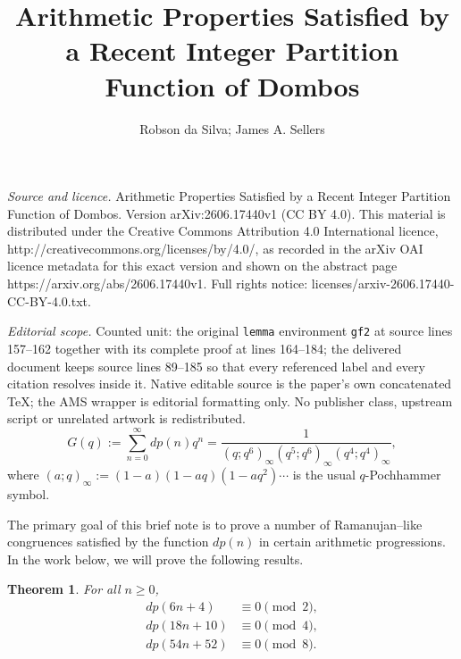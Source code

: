 \documentclass[10pt,a4paper]{amsart}
\newtheorem{theorem}{Theorem}[section]
\begin{document}
\title[Arithmetic Properties Satisfied by a Recent Integer Partitio]{Arithmetic Properties Satisfied by a Recent Integer Partition Function of Dombos}
\author{Robson da Silva; James A. Sellers}
\date{}
\maketitle
\noindent\emph{Source and licence.} Arithmetic Properties Satisfied by a Recent Integer Partition Function of Dombos. Version arXiv:2606.17440v1 (CC BY 4.0). This material is distributed under the Creative Commons Attribution 4.0 International licence, http://creativecommons.org/licenses/by/4.0/, as recorded in the arXiv OAI licence metadata for this exact version and shown on the abstract page https://arxiv.org/abs/2606.17440v1. Full rights notice: licenses/arxiv-2606.17440-CC-BY-4.0.txt.\par\smallskip
\noindent\textit{Editorial scope.} Counted unit: the original \texttt{lemma} environment \texttt{gf2} at source lines 157--162 together with its complete proof at lines 164--184; the delivered document keeps source lines 89--185 so that every referenced label and every citation resolves inside it. Native editable source is the paper's own concatenated TeX; the AMS wrapper is editorial formatting only. No publisher class, upstream script or unrelated artwork is redistributed.
\begin{equation}
G(q):=\sum_{n=0}^{\infty} dp(n)q^n = \frac{1}{(q;q^6)_\infty (q^5;q^6)_\infty (q^4;q^4)_\infty},
\label{gf1}
\end{equation}
where $(a;q)_\infty := (1-a)(1-aq)(1-aq^{2})\cdots$
is the usual $q$-Pochhammer symbol. 

The primary goal of this brief note is to prove a number of Ramanujan--like congruences satisfied by the function $dp(n)$ in certain arithmetic progressions.  In the work below, we will prove the following results. 

\begin{theorem}
For all $n \geq 0$,
	\begin{align}
	dp(6n+4) & \equiv 0 \pmod{2}, \label{c1} \\ 
    dp(18n+10) & \equiv 0 \pmod{4}, \label{c3} \\
    dp(54n+52) &  \equiv 0 \pmod{8}. \label{c4}
    \end{align}
\label{Th1}
\end{theorem}
\end{document}
